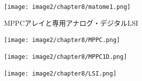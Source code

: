 \begin{figure}[H]
 \begin{center}
 \texttt{[image: image2/chapter8/matome1.png]} 
 \end{center}
 \caption{MPPCアレイと専用アナログ・デジタルLSI}
 \label{fig:matome}
\end{figure}

\begin{figure}[H]
 \begin{minipage}{0.5\hsize}
  \begin{center}
   \texttt{[image: image2/chapter8/MPPC.png]} 
  \end{center}
  \vspace{-1cm}
  \caption*{}
 \end{minipage}
 \begin{minipage}{0.5\hsize}
  \begin{center}
 \texttt{[image: image2/chapter8/MPPC1D.png]} 
  \end{center}
  \vspace{-1cm}
  \caption*{}
 \end{minipage}
  \begin{minipage}{0.5\hsize}
  \hspace{+4cm}
 \texttt{[image: image2/chapter8/LSI.png]} 
  \vspace{-1cm}
  \caption*{}
 \end{minipage}
 \begin{center}
  \caption{}
  \label{fig:gaikan}
  \end{center}
\end{figure}
\fi
